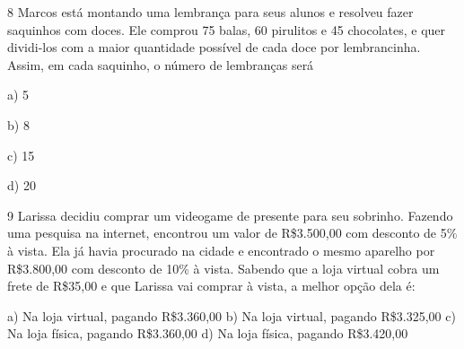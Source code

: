 
\num{8} Marcos está montando uma lembrança para seus alunos e resolveu fazer
saquinhos com doces. Ele comprou 75 balas, 60 pirulitos e 45 chocolates,
e quer dividi-los com a maior quantidade possível de cada doce por
lembrancinha. Assim, em cada saquinho, o número de lembranças será

a) 5

b) 8

c) 15

d) 20




\num{9} Larissa decidiu comprar um videogame de presente para seu sobrinho.
Fazendo uma pesquisa na internet, encontrou um valor de R\$3.500,00 com
desconto de 5\% à vista. Ela já havia procurado na cidade e encontrado o
mesmo aparelho por R\$3.800,00 com desconto de 10\% à vista. Sabendo que
a loja virtual cobra um frete de R\$35,00 e que Larissa vai comprar à
vista, a melhor opção dela é:

a) Na loja virtual, pagando R\$3.360,00 b) Na loja virtual, pagando
R\$3.325,00 c) Na loja física, pagando R\$3.360,00 d) Na loja física,
pagando R\$3.420,00



